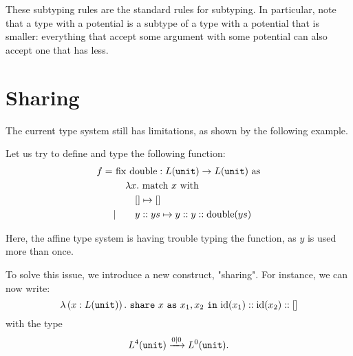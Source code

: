 \documentclass[ manuscript,screen, nonacm]{acmart}
\begin{document}

These subtyping rules are the standard rules for subtyping. In particular, note that
a type with a potential is a subtype of a type with a potential that is smaller: everything
that accept some argument with some potential can also accept one that has less.


\section{Sharing}

The current type system still has limitations, as shown by the following example.
\begin{example}
  Let us try to define and type the following function:
  \begin{align*}
    f =\ &\mathrm{fix~double}: L(\mathtt{unit}) \rightarrow L(\mathtt{unit})~\mathrm{as}\\
      &\quad \lambda x.~\mathrm{match}~x~\mathrm{with} \\
      &\quad\quad [] \mapsto []\\
      \mid&\quad\quad y::ys \mapsto y::y::\mathrm{double}(ys)
  \end{align*}
  
  Here, the affine type system is having trouble typing the function, as \(y\) is used
  more than once.
\end{example}

To solve this issue, we introduce a new construct, "sharing".
For instance, we can now write:
\[
  \lambda\left(x:L(\mathtt{unit})\right).~\mathtt{share}~x~\mathtt{as}~x_1,x_2~\mathtt{in}~\mathrm{id}(x_1)::\mathrm{id}(x_2)::[]
\]
with the type
\[
L^4(\mathtt{unit}) \xrightarrow{0|0} L^0(\mathtt{unit}).
\]
\end{document}
